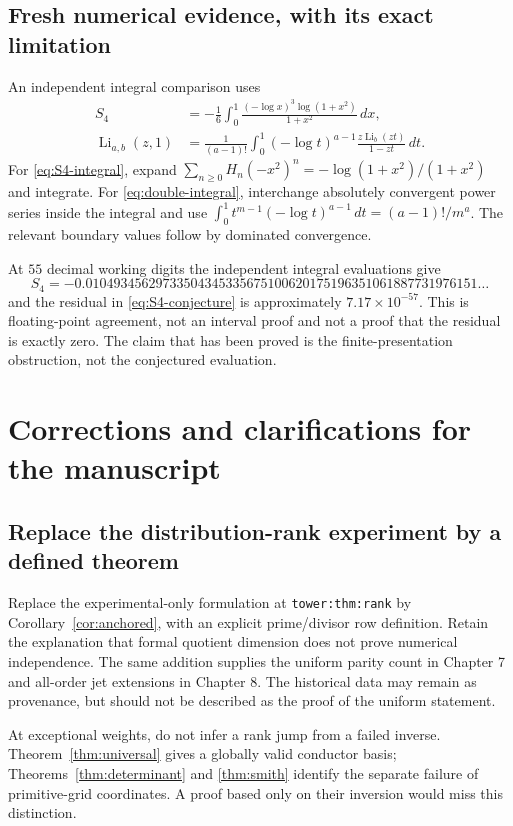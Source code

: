 \documentclass[11pt]{article}
\numberwithin{equation}{section}
\theoremstyle{definition}
\theoremstyle{remark}
\DeclareMathOperator{\Li}{Li}
\newcommand{\code}[1]{\texttt{\small #1}}
\begin{document}
\subsection{Fresh numerical evidence, with its exact limitation}
An independent integral comparison uses
\begin{align}
 S_4&=-\frac16\int_0^1
 \frac{(-\log x)^3\log(1+x^2)}{1+x^2}\,dx,\label{eq:S4-integral}\\
 \Li_{a,b}(z,1)&=\frac1{(a-1)!}\int_0^1
 (-\log t)^{a-1}\frac{z\Li_b(zt)}{1-zt}\,dt.
 \label{eq:double-integral}
\end{align}
For \eqref{eq:S4-integral}, expand
$\sum_{n\ge0}H_n(-x^2)^n=-\log(1+x^2)/(1+x^2)$ and integrate.
For \eqref{eq:double-integral}, interchange absolutely convergent
power series inside the integral and use
$\int_0^1t^{m-1}(-\log t)^{a-1}\,dt=(a-1)!/m^a$.
The relevant boundary values follow by dominated convergence.

At $55$ decimal working digits the independent integral evaluations give
\[
 S_4=-0.01049345629733504345335675100620175196351061887731976151\ldots
\]
and the residual in \eqref{eq:S4-conjecture} is approximately
$7.17\times10^{-57}$. This is floating-point agreement, not an interval
proof and not a proof that the residual is exactly zero. The claim that
has been proved is the finite-presentation obstruction, not the
conjectured evaluation.

\section{Corrections and clarifications for the manuscript}\label{sec:audit}

\subsection{Replace the distribution-rank experiment by a defined theorem}
Replace the experimental-only formulation at
\code{tower:thm:rank} by Corollary~\ref{cor:anchored}, with an explicit
prime/divisor row definition. Retain the explanation that formal quotient
dimension does not prove numerical independence. The same addition
supplies the uniform parity count in Chapter 7 and all-order jet
extensions in Chapter 8. The historical data may remain as provenance,
but should not be described as the proof of the uniform statement.

At exceptional weights, do not infer a rank jump from a failed inverse.
Theorem~\ref{thm:universal} gives a globally valid conductor basis;
Theorems~\ref{thm:determinant} and \ref{thm:smith} identify the separate
failure of primitive-grid coordinates. A proof based only on their
inversion would miss this distinction.
\end{document}
